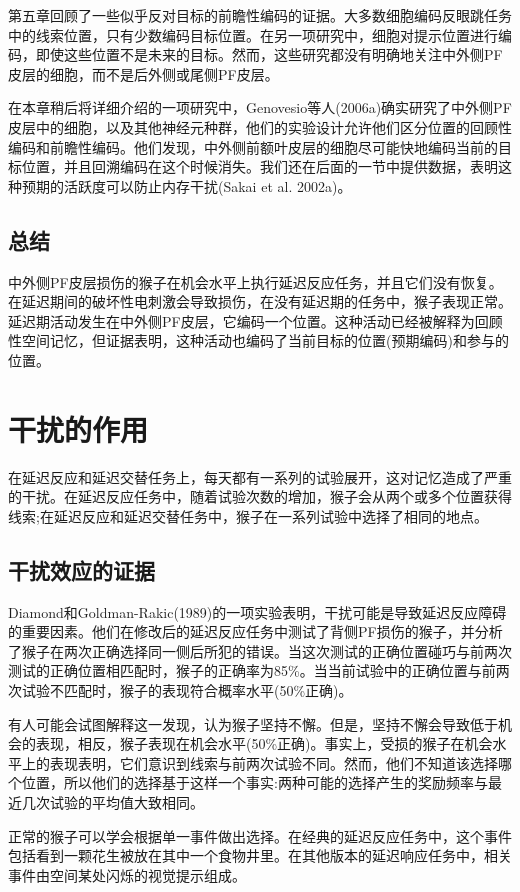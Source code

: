 第五章回顾了一些似乎反对目标的前瞻性编码的证据。大多数细胞编码反眼跳任务中的线索位置，只有少数编码目标位置。在另一项研究中，细胞对提示位置进行编码，即使这些位置不是未来的目标。然而，这些研究都没有明确地关注中外侧PF皮层的细胞，而不是后外侧或尾侧PF皮层。

在本章稍后将详细介绍的一项研究中，Genovesio等人(2006a)确实研究了中外侧PF皮层中的细胞，以及其他神经元种群，他们的实验设计允许他们区分位置的回顾性编码和前瞻性编码。他们发现，中外侧前额叶皮层的细胞尽可能快地编码当前的目标位置，并且回溯编码在这个时候消失。我们还在后面的一节中提供数据，表明这种预期的活跃度可以防止内存干扰(Sakai et al. 2002a)。

\subsection{总结}
中外侧PF皮层损伤的猴子在机会水平上执行延迟反应任务，并且它们没有恢复。在延迟期间的破坏性电刺激会导致损伤，在没有延迟期的任务中，猴子表现正常。延迟期活动发生在中外侧PF皮层，它编码一个位置。这种活动已经被解释为回顾性空间记忆，但证据表明，这种活动也编码了当前目标的位置(预期编码)和参与的位置。

\section{干扰的作用}
在延迟反应和延迟交替任务上，每天都有一系列的试验展开，这对记忆造成了严重的干扰。在延迟反应任务中，随着试验次数的增加，猴子会从两个或多个位置获得线索;在延迟反应和延迟交替任务中，猴子在一系列试验中选择了相同的地点。

\subsection{干扰效应的证据}
Diamond和Goldman-Rakic(1989)的一项实验表明，干扰可能是导致延迟反应障碍的重要因素。他们在修改后的延迟反应任务中测试了背侧PF损伤的猴子，并分析了猴子在两次正确选择同一侧后所犯的错误。当这次测试的正确位置碰巧与前两次测试的正确位置相匹配时，猴子的正确率为85\%。当当前试验中的正确位置与前两次试验不匹配时，猴子的表现符合概率水平(50\%正确)。

有人可能会试图解释这一发现，认为猴子坚持不懈。但是，坚持不懈会导致低于机会的表现，相反，猴子表现在机会水平(50\%正确)。事实上，受损的猴子在机会水平上的表现表明，它们意识到线索与前两次试验不同。然而，他们不知道该选择哪个位置，所以他们的选择基于这样一个事实:两种可能的选择产生的奖励频率与最近几次试验的平均值大致相同。

正常的猴子可以学会根据单一事件做出选择。在经典的延迟反应任务中，这个事件包括看到一颗花生被放在其中一个食物井里。在其他版本的延迟响应任务中，相关事件由空间某处闪烁的视觉提示组成。

